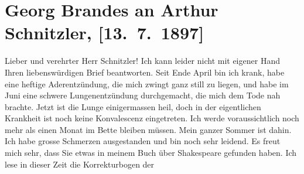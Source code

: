 

         
         \renewcommand{\erwaehntePersonen}{Personen: Georg Brandes, Paul Goldmann, William Shakespeare}
         \renewcommand{\erwaehnteOrte}{Orte: Bad Ischl, Dänemark, Kopenhagen}
         \renewcommand{\erwaehnteWerke}{Werke: William Shakespeare}
               \section[Georg Brandes an Arthur Schnitzler, {[}13. 7. 1897{]}]{ Georg Brandes an Arthur Schnitzler, {[}13. 7. 1897{]}}\nopagebreak{}\rehead{ }\begin{ledgroupsized}[t]{13cm}\normalsize\beginnumbering{} \toendnotes[C]{\smallbreak\pagebreak[2]} 
\toendnotes[C]{\smallbreak}\pstart{}{\pb}Lieber und verehrter Herr
                  Schnitzler!\pend\pstart
           Ich kann leider nicht mit eigener Hand Ihren liebenswürdigen Brief beantworten. Seit
                  Ende April bin ich krank, habe eine heftige Aderentzündung, die mich
               zwingt ganz still zu liegen, und habe im Juni eine schwere
               Lungenentzündung durchgemacht, die mich dem Tode nah brachte. Jetzt ist die Lunge
               einigermassen heil, doch in der eigentlichen Krankheit ist noch keine Konvalescenz
               eingetreten. Ich werde voraussichtlich noch mehr als einen Monat im Bette bleiben
               müssen. Mein ganzer Sommer ist dahin. Ich habe grosse Schmerzen ausgestanden und bin
               noch sehr leidend.\pend
           \pstart
           Es freut mich sehr, dass Sie etwas in {\pb}meinem Buch über Shakespeare gefunden haben. Ich lese in dieser Zeit die Korrekturbogen der

\end{ledgroupsized}

